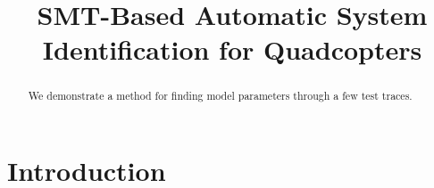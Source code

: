 \documentclass[conference]{IEEEtran}
\title{SMT-Based Automatic System Identification for Quadcopters}
\begin{document}
\maketitle

\begin{abstract}
We demonstrate a method for finding model parameters through a few test traces.
\end{abstract}

\section{Introduction}

\section{}






\end{document}
